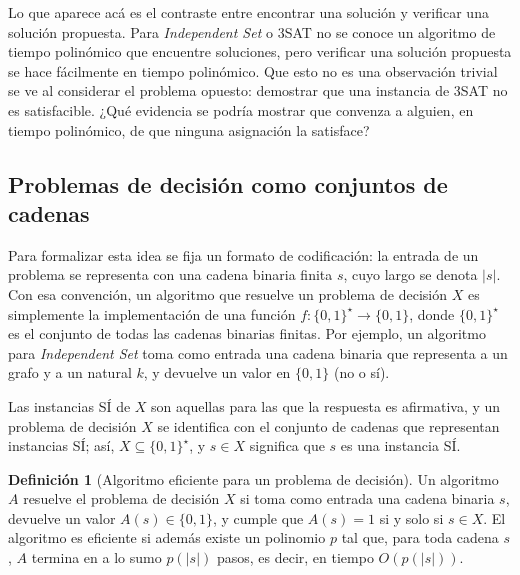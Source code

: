 \documentclass[12pt, spanish, oneside, openany]{book}
\newcommand{\prob}[1]{\textit{#1}}
\newcommand{\IS}{\prob{Independent Set}\xspace}
\theoremstyle{uprightplain}
\theoremstyle{definition}
\newtheorem{definicion}[teorema]{Definición}
\theoremstyle{remark}
\theoremstyle{definition}
\begin{document}
Lo que aparece acá es el contraste entre encontrar una solución y verificar una solución propuesta. Para \IS o 3SAT no se conoce un algoritmo de tiempo polinómico que encuentre soluciones, pero verificar una solución propuesta se hace fácilmente en tiempo polinómico. Que esto no es una observación trivial se ve al considerar el problema opuesto: demostrar que una instancia de 3SAT no es satisfacible. ¿Qué evidencia se podría mostrar que convenza a alguien, en tiempo polinómico, de que ninguna asignación la satisface?

\subsection{Problemas de decisión como conjuntos de cadenas}

Para formalizar esta idea se fija un formato de codificación: la entrada de un problema se representa con una cadena binaria finita $s$, cuyo largo se denota $|s|$. Con esa convención, un algoritmo que resuelve un problema de decisión $X$ es simplemente la implementación de una función $f:\{0,1\}^{\star}\to\{0,1\}$, donde $\{0,1\}^{\star}$ es el conjunto de todas las cadenas binarias finitas. Por ejemplo, un algoritmo para \IS toma como entrada una cadena binaria que representa a un grafo y a un natural $k$, y devuelve un valor en $\{0,1\}$ (no o sí).

Las instancias SÍ de $X$ son aquellas para las que la respuesta es afirmativa, y un problema de decisión $X$ se identifica con el conjunto de cadenas que representan instancias SÍ; así, $X\subseteq\{0,1\}^{\star}$, y $s\in X$ significa que $s$ es una instancia SÍ.

\begin{definicion}[Algoritmo eficiente para un problema de decisión]
\label{def:np-alg-eficiente}
Un algoritmo $A$ resuelve el problema de decisión $X$ si toma como entrada una cadena binaria $s$, devuelve un valor $A(s)\in\{0,1\}$, y cumple que $A(s)=1$ si y solo si $s\in X$. El algoritmo es eficiente si además existe un polinomio $p$ tal que, para toda cadena $s$, $A$ termina en a lo sumo $p(|s|)$ pasos, es decir, en tiempo $O(p(|s|))$.
\end{definicion}
\end{document}
